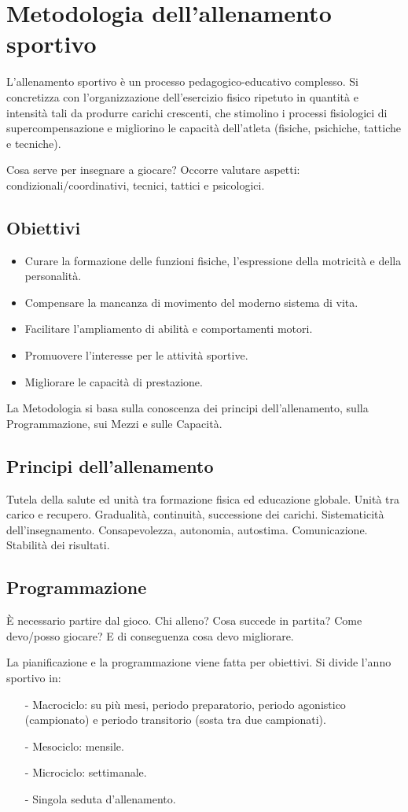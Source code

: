 \chapter{Metodologia dell'allenamento sportivo}

L'allenamento sportivo è un processo pedagogico-educativo complesso. Si concretizza con l'organizzazione dell'esercizio fisico ripetuto in quantità e intensità tali da produrre carichi crescenti, che stimolino i processi fisiologici di supercompensazione e migliorino le capacità dell'atleta (fisiche, psichiche, tattiche e tecniche).

Cosa serve per insegnare a giocare?
Occorre valutare aspetti: condizionali/coordinativi, tecnici, tattici e psicologici.

\section{Obiettivi}
\begin{itemize}
\item Curare la formazione delle funzioni fisiche, l'espressione della motricità e della personalità.
\item Compensare la mancanza di movimento del moderno sistema di vita.
\item Facilitare l'ampliamento di abilità e comportamenti motori.
\item Promuovere l'interesse per le attività sportive.
\item Migliorare le capacità di prestazione.
\end{itemize}

La Metodologia si basa sulla conoscenza dei principi dell'allenamento, sulla Programmazione, sui Mezzi e sulle Capacità.

\section{Principi dell'allenamento}
Tutela della salute ed unità tra formazione fisica ed educazione globale.
Unità tra carico e recupero.
Gradualità, continuità, successione dei carichi.
Sistematicità dell'insegnamento.
Consapevolezza, autonomia, autostima.
Comunicazione.
Stabilità dei risultati.


\section{Programmazione}
\`E necessario partire dal gioco. Chi alleno? Cosa succede in partita? Come devo/posso giocare? E di conseguenza cosa devo migliorare.
\begin{ross}
La pianificazione e la programmazione viene fatta per obiettivi. Si divide
l'anno sportivo in:
\begin{enumerate}
\item[-]Macrociclo: su più mesi, periodo preparatorio, periodo agonistico
(campionato) e periodo transitorio (sosta tra due campionati).
\item[-]Mesociclo: mensile.
\item[-]Microciclo: settimanale.
\item[-]Singola seduta d'allenamento.
\end{enumerate}
\end{ross}

